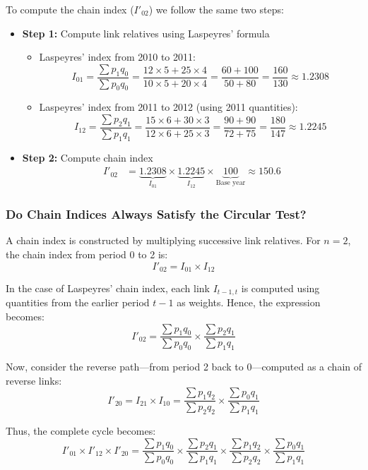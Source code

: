 \documentclass[twoside]{book}
\begin{document}
To compute the chain index ($I'_{02}$) we follow the same two steps:

\begin{itemize}
  \item \textbf{Step 1:} Compute link relatives using Laspeyres' formula
    \begin{itemize}
      \item {Laspeyres' index from 2010 to 2011:}
      \[
      I_{01}
      = \frac{\sum p_{1} q_{0}}{\sum p_{0} q_{0}}
      = \frac{12 \times 5 + 25 \times 4}{10 \times 5 + 20 \times 4}
      = \frac{60 + 100}{50 + 80}
      = \frac{160}{130}
      \approx 1.2308
      \]

      \item {Laspeyres' index from 2011 to 2012 (using 2011 quantities):}
      \[
      I_{12}
      = \frac{\sum p_{2} q_{1}}{\sum p_{1} q_{1}}
      = \frac{15 \times 6 + 30 \times 3}{12 \times 6 + 25 \times 3}
      = \frac{90 + 90}{72 + 75}
      = \frac{180}{147}
      \approx 1.2245
      \]
    \end{itemize}

  \item \textbf{Step 2:} Compute chain index
    \begin{align*}
    I'_{02} &= \underbrace{1.2308}_{I_{01}} \times \underbrace{1.2245}_{I_{12}} \times \underbrace{100}_{\text{Base year}}\approx 150.6
    \end{align*}
\end{itemize}

\subsubsection{Do Chain Indices Always Satisfy the Circular Test?}

A {chain index} is constructed by multiplying successive link relatives. For \(n = 2\), the chain index from period 0 to 2 is:
\[
I'_{02} = I_{01} \times I_{12}
\]

In the case of {Laspeyres' chain index}, each link \(I_{t-1,t}\) is computed using {quantities from the earlier period} \(t-1\) as weights. Hence, the expression becomes:
\[
I'_{02} = \frac{\sum p_1 q_0}{\sum p_0 q_0} \times \frac{\sum p_2 q_1}{\sum p_1 q_1}
\]

Now, consider the reverse path—from period 2 back to 0—computed as a chain of reverse links:
\[
I'_{20} = I_{21} \times I_{10} = \frac{\sum p_1 q_2}{\sum p_2 q_2} \times \frac{\sum p_0 q_1}{\sum p_1 q_1}
\]

Thus, the complete cycle becomes:
\[
I'_{01} \times I'_{12} \times I'_{20}
= \frac{\sum p_1 q_0}{\sum p_0 q_0}
  \times \frac{\sum p_2 q_1}{\sum p_1 q_1}
  \times \frac{\sum p_1 q_2}{\sum p_2 q_2}
  \times \frac{\sum p_0 q_1}{\sum p_1 q_1}
\]
\end{document}
